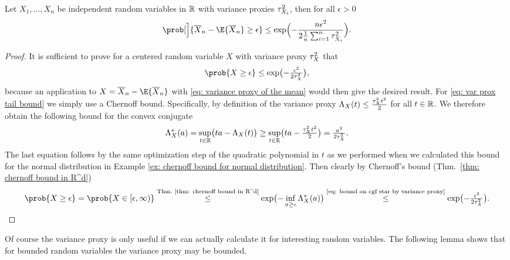 \begin{mdframed}[innertopmargin=0pt]
\begin{theorem}
    \label{thm: general hoeffding inequality}
    Let \(X_1, \ldots, X_n\) be independent random variables in \(\mathbb{R}\) with
    variance proxies \(\tau^2_{X_i}\), then for all \(\epsilon > 0\)
    \[
        \prob[\Big]{\mean{X}_n - \E{\mean{X}_n} \ge \epsilon}
        \le \exp\Bigl(-\frac{n \epsilon^2}{2\frac1n\sum_{i=1}^n \varProx{X_i}}\Bigr).
    \]
\end{theorem}
\end{mdframed}
\begin{proof}
    It is sufficient to prove for a centered random variable \(X\) with variance
    proxy \(\tau^2_{X}\) that
    \begin{equation}
        \label{eq: var prox tail bound}    
        \prob{X \ge \epsilon} \le \exp\bigl(-\tfrac{\epsilon^2}{2\varProx{X}}\bigr),
    \end{equation}
    because an application to \(X = \mean{X}_n - \E{\mean{X}_n}\) with
    \eqref{eq: variance proxy of the mean} would then give the desired result.
    For \eqref{eq: var prox tail bound} we simply use a Chernoff bound. 
    Specifically, by definition of the variance proxy \(\Lambda_X(t) \le \frac{\tau^2_{X} t^2}2\) for all \(t\in \mathbb{R}\).
    We therefore obtain the following bound for the convex conjugate
    \begin{equation}
        \label{eq: bound on cgf star by variance proxy}    
        \Lambda_X^*(a)
        = \sup_{t\in \mathbb{R}} \bigl(t a - \Lambda_X(t)\bigr)
        \ge \sup_{t\in \mathbb{R}} \bigl(t a - \tfrac{\tau^2_{X} t^2}2\bigr)
        = \tfrac{a^2}{2\tau^2_{X}}.
    \end{equation}
    The last equation follows by the same optimization step of the quadratic
    polynomial in \(t\) as we performed when we calculated this bound for the
    normal distribution in Example \ref{ex: chernoff bound for normal
    distribution}. Then clearly by Chernoff's bound (Thm.~\ref{thm: chernoff bound in R^d})
    \[
        \prob{X\ge \epsilon} = \prob{X \in [\epsilon , \infty)}
        \overset{\text{Thm.~\ref{thm: chernoff bound in R^d}}}\le \exp\bigl(-\inf_{a \ge \epsilon}\CGF_X^*(a)\bigr)
        \overset{\text{\eqref{eq: bound on cgf star by variance proxy}}}\le \exp\bigl(-\tfrac{\epsilon^2}{2\varProx{X}}\bigr).
        \qedhere
    \]
\end{proof}

Of course the variance proxy is only useful if we can actually calculate it for
interesting random variables. The following lemma shows that for bounded random
variables the variance proxy may be bounded.


